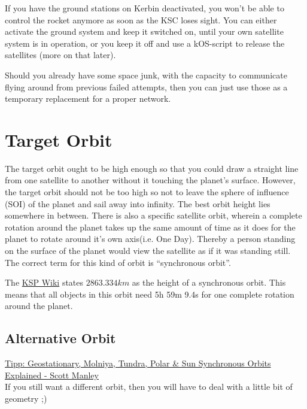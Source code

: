 \documentclass[12pt,paper=A4,numbers=noenddot,bibliography=totoc,listof=totoc,DIV=11,BCOR=1mm]{scrreprt}
\begin{document}
If you have the ground stations on Kerbin deactivated, you won't be able to control the rocket anymore as soon as the KSC loses sight. You can either activate the ground system and keep it switched on, until your own satellite system is in operation, or you keep it off and use a kOS-script to release the satellites (more on that later).

Should you already have some space junk, with the capacity to communicate flying around from previous failed attempts, then you can just use those as a temporary replacement for a proper network.


\section{Target Orbit}
The target orbit ought to be high enough so that you could draw a straight line from one satellite to another without it touching the planet's surface. However, the target orbit should not be too high so not to leave the sphere of influence (SOI) of the planet and sail away into infinity. The best orbit height lies somewhere in between. There is also a specific satellite orbit, wherein a complete rotation around the planet takes up the same amount of time as it does for the planet to rotate around it’s own axis(i.e. One Day). Thereby a person standing on the surface of the planet would view the satellite as if it was standing still. The correct term for this kind of orbit is ``synchronous orbit''.

The \href{https://wiki.kerbalspaceprogram.com/wiki/Kerbin}{KSP Wiki} states $2863.334km$ as the height of a synchronous orbit. This means that all objects in this orbit need 5h 59m 9.4s for one complete rotation around the planet.


\subsection{Alternative Orbit}
\href{https://youtu.be/PZAkiXNJIqc}{Tipp: Geostationary, Molniya, Tundra, Polar \& Sun Synchronous Orbits Explained - Scott Manley}\\
If you still want a different orbit, then you will have to deal with a little bit of geometry ;)
\end{document}
